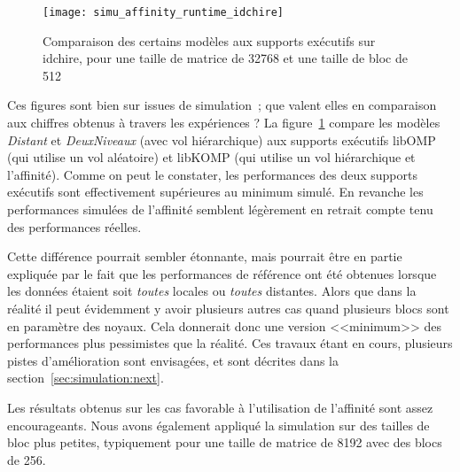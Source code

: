 \begin{figure}[t!]
  \centering
  \texttt{[image: simu\_affinity\_runtime\_idchire]}
  \caption{Comparaison des certains modèles aux supports exécutifs sur idchire, pour une taille de matrice de 32768 et une taille de bloc de 512}\label{fig:simu:modeles-vs-runtime:idchire}
\end{figure}


Ces figures sont bien sur issues de simulation~; que valent elles en comparaison aux chiffres obtenus à travers les expériences ?
La figure~\ref{fig:simu:modeles-vs-runtime:idchire} compare les modèles \emph{Distant} et \emph{DeuxNiveaux} (avec vol hiérarchique) aux supports exécutifs libOMP (qui utilise un vol aléatoire) et libKOMP (qui utilise un vol hiérarchique et l'affinité).
Comme on peut le constater, les performances des deux supports exécutifs sont effectivement supérieures au minimum simulé. En revanche les performances simulées de l'affinité semblent légèrement en retrait compte tenu des performances réelles.

Cette différence pourrait sembler étonnante, mais pourrait être en partie expliquée par le fait que les performances de référence ont été obtenues lorsque les données étaient soit \textit{toutes} locales ou \textit{toutes} distantes.
Alors que dans la réalité il peut évidemment y avoir plusieurs autres cas quand plusieurs blocs sont en paramètre des noyaux.
Cela donnerait donc une version <<minimum>> des performances plus pessimistes que la réalité.
Ces travaux étant en cours, plusieurs pistes d'amélioration sont envisagées, et sont décrites dans la section~\ref{sec:simulation:next}.





Les résultats obtenus sur les cas favorable à l'utilisation de l'affinité sont assez encourageants.
Nous avons également appliqué la simulation sur des tailles de bloc plus petites, typiquement pour une taille de matrice de 8192 avec des blocs de 256.

